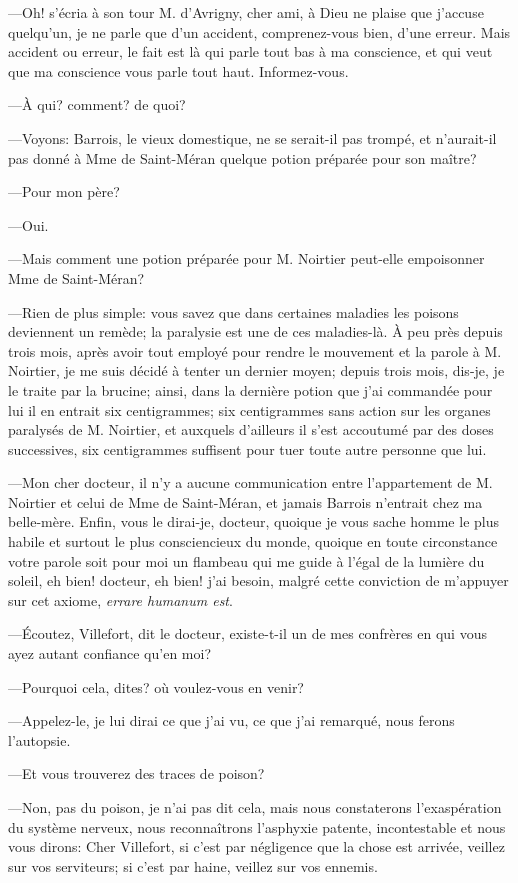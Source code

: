 —Oh! s'écria à son tour M. d'Avrigny, cher ami, à Dieu ne plaise que j'accuse quelqu'un, je ne parle que d'un accident, comprenez-vous bien, d'une erreur. Mais accident ou erreur, le fait est là qui parle tout bas à ma conscience, et qui veut que ma conscience vous parle tout haut. Informez-vous. 

—À qui? comment? de quoi? 

—Voyons: Barrois, le vieux domestique, ne se serait-il pas trompé, et n'aurait-il pas donné à Mme de Saint-Méran quelque potion préparée pour son maître? 

—Pour mon père? 

—Oui. 

—Mais comment une potion préparée pour M. Noirtier peut-elle empoisonner Mme de Saint-Méran? 

—Rien de plus simple: vous savez que dans certaines maladies les poisons deviennent un remède; la paralysie est une de ces maladies-là. À peu près depuis trois mois, après avoir tout employé pour rendre le mouvement et la parole à M. Noirtier, je me suis décidé à tenter un dernier moyen; depuis trois mois, dis-je, je le traite par la brucine; ainsi, dans la dernière potion que j'ai commandée pour lui il en entrait six centigrammes; six centigrammes sans action sur les organes paralysés de M. Noirtier, et auxquels d'ailleurs il s'est accoutumé par des doses successives, six centigrammes suffisent pour tuer toute autre personne que lui. 

—Mon cher docteur, il n'y a aucune communication entre l'appartement de M. Noirtier et celui de Mme de Saint-Méran, et jamais Barrois n'entrait chez ma belle-mère. Enfin, vous le dirai-je, docteur, quoique je vous sache homme le plus habile et surtout le plus consciencieux du monde, quoique en toute circonstance votre parole soit pour moi un flambeau qui me guide à l'égal de la lumière du soleil, eh bien! docteur, eh bien! j'ai besoin, malgré cette conviction de m'appuyer sur cet axiome, \textit{errare humanum est}. 

—Écoutez, Villefort, dit le docteur, existe-t-il un de mes confrères en qui vous ayez autant confiance qu'en moi? 

—Pourquoi cela, dites? où voulez-vous en venir? 

—Appelez-le, je lui dirai ce que j'ai vu, ce que j'ai remarqué, nous ferons l'autopsie. 

—Et vous trouverez des traces de poison? 

—Non, pas du poison, je n'ai pas dit cela, mais nous constaterons l'exaspération du système nerveux, nous reconnaîtrons l'asphyxie patente, incontestable et nous vous dirons: Cher Villefort, si c'est par négligence que la chose est arrivée, veillez sur vos serviteurs; si c'est par haine, veillez sur vos ennemis. 

